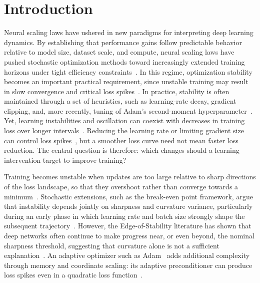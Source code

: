\section{Introduction}
\label{sec:introduction}


Neural scaling laws have ushered in new paradigms for interpreting deep learning dynamics. By establishing that performance gains follow predictable behavior relative to model size, dataset scale, and compute, neural scaling laws have pushed stochastic optimization methods toward increasingly extended training horizons under tight efficiency constraints~\cite{hestness2017deep, kaplan2020scaling, henighan2020scaling, hoffmann2022chinchilla}. In this regime, optimization stability becomes an important practical requirement, since unstable training may result in slow convergence and critical loss spikes~\cite{bai2026spikes}. In practice, stability is often maintained through a set of heuristics, such as learning-rate decay, gradient clipping, and, more recently, tuning of Adam's second-moment hyperparameter~\cite{loshchilov2016sgdr,pascanu2013difficulty,bai2026spikes}. Yet, learning instabilities and oscillation can coexist with decreases in training loss over longer intervals~\cite{cohen2021edge,damian2023self}. Reducing the learning rate or limiting gradient size can control loss spikes~\cite{smith2017cyclical,pascanu2013difficulty}, but a smoother loss curve need not mean faster loss reduction. The central question is therefore: which changes should a learning intervention target to improve training?

Training becomes unstable when updates are too large relative to sharp directions of the loss landscape, so that they overshoot rather than converge towards a minimum~\cite{polyak1964methods, bertsekas1997nonlinear}. Stochastic extensions, such as the break-even point framework, argue that instability depends jointly on sharpness and curvature variance, particularly during an early phase in which learning rate and batch size strongly shape the subsequent trajectory~\cite{jastrzebski2020break}. However, the Edge-of-Stability literature has shown that deep networks often continue to make progress near, or even beyond, the nominal sharpness threshold, suggesting that curvature alone is not a sufficient explanation~\cite{cohen2021edge, arora2022understanding, damian2023self}. An adaptive optimizer such as Adam~\cite{kingma2014adam} adds additional complexity through memory and coordinate scaling: its adaptive preconditioner can produce loss spikes even in a quadratic loss function~\cite{bai2026spikes}.

